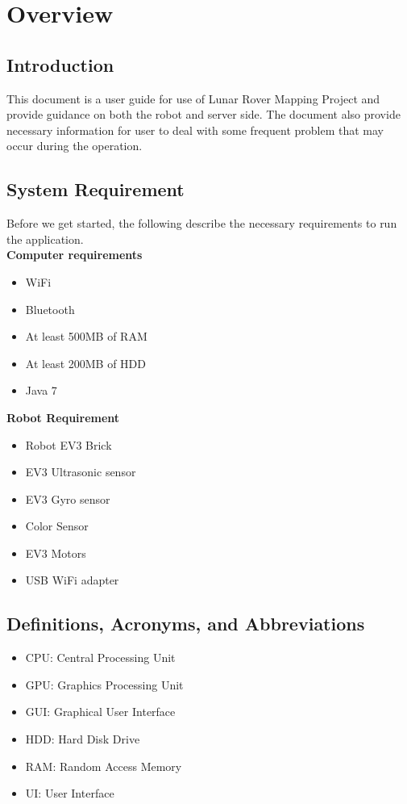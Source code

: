 \documentclass[12pt,a4paper]{article}
\begin{document}
    \vspace{50px}
    \listoffigures

	\newpage



\section{Overview}

\subsection{Introduction}
	This document is a user guide for use of Lunar Rover Mapping Project and provide guidance on both the robot and server side. The document also provide necessary information for user to deal with some frequent problem that may occur during the operation.
\subsection{System Requirement}
Before we get started, the following describe the necessary requirements to run the application. \\ 
\newline
\textbf{Computer requirements} 
	\begin{itemize}
	\item WiFi
    \item Bluetooth
    \item At least 500MB of RAM
    \item At least 200MB of HDD
    \item Java 7
    \end{itemize}
\textbf{Robot Requirement} 
	\begin{itemize}
    \item Robot EV3 Brick
    \item EV3 Ultrasonic sensor
    \item EV3 Gyro sensor
    \item Color Sensor
    \item EV3 Motors
	\item USB WiFi adapter
    \end{itemize}

\subsection{Definitions, Acronyms, and Abbreviations}
\begin{itemize}
\item CPU: Central Processing Unit
\item GPU: Graphics Processing Unit
\item GUI: Graphical User Interface
\item HDD: Hard Disk Drive
\item RAM: Random Access Memory
\item UI: User Interface
\end{itemize}
\end{document}
